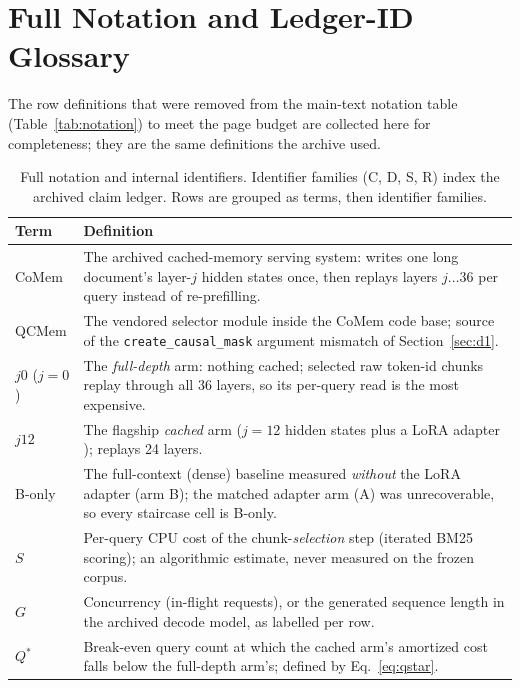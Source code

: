 \documentclass{article}
\newcommand{\code}[1]{\texttt{#1}}
\begin{document}
\section{Full Notation and Ledger-ID Glossary}\label{app:notation}
The row definitions that were removed from the main-text notation table (Table~\ref{tab:notation})
to meet the page budget are collected here for completeness; they are the same definitions the
archive used.

\begin{table}[!ht]
\centering
\caption{Full notation and internal identifiers. Identifier families (C, D, S, R) index the
archived claim ledger. Rows are grouped as terms, then identifier families.}
\label{tab:notation-full}
\footnotesize
\setlength{\tabcolsep}{3pt}
\begin{tabular}{@{}>{\raggedright\arraybackslash}p{2.0cm}>{\raggedright\arraybackslash}p{11.4cm}@{}}
\toprule
\textbf{Term} & \textbf{Definition} \\
\midrule
CoMem & The archived cached-memory serving system: writes one long document's layer-$j$ hidden
states once, then replays layers $j\ldots36$ per query instead of re-prefilling. \\
\addlinespace
QCMem & The vendored selector module inside the CoMem code base; source of the
\code{create\_causal\_mask} argument mismatch of Section~\ref{sec:d1}. \\
\addlinespace
$j0$ ($j{=}0$) & The \emph{full-depth} arm: nothing cached; selected raw token-id chunks replay
through all 36 layers, so its per-query read is the most expensive. \\
\addlinespace
$j12$ & The flagship \emph{cached} arm ($j{=}12$ hidden states plus a LoRA adapter
\citep{hu2022lora}); replays 24 layers. \\
\addlinespace
B-only & The full-context (dense) baseline measured \emph{without} the LoRA adapter (arm B); the
matched adapter arm (A) was unrecoverable, so every staircase cell is B-only. \\
\addlinespace
$S$ & Per-query CPU cost of the chunk-\emph{selection} step (iterated BM25 scoring); an
algorithmic estimate, never measured on the frozen corpus. \\
\addlinespace
$G$ & Concurrency (in-flight requests), or the generated sequence length in the archived
decode model, as labelled per row. \\
\addlinespace
$Q^{*}$ & Break-even query count at which the cached arm's amortized cost falls below the
full-depth arm's; defined by Eq.~\ref{eq:qstar}. \\

\end{tabular}
\end{table}
\end{document}
